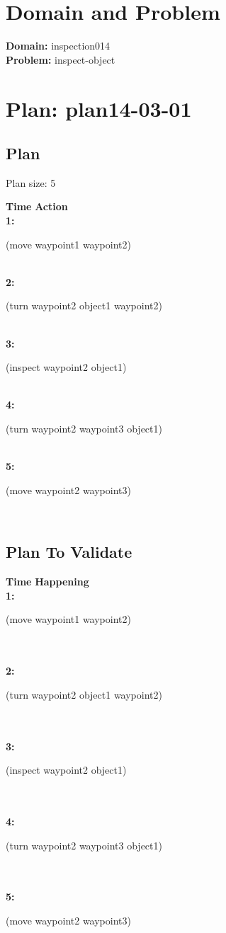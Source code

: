 \documentclass[a4paper,12pt]{article}
\author{\mbox{\sc {\sc Val}}}
\newcommand{\headingtimeaction}{{\bf Time} \qquad \= {\bf Action}\\[0.8ex]}
\newcommand{\headingtimehappening}{{\bf Time} \qquad \= {\bf Happening}\\[0.8ex]}
\newcommand{\atime}[1]{{\bf #1:}}
\newcommand{\action}[1]{{\sf #1}}
\newcommand{\listrow}[1]{\begin{minipage}[t]{11.5cm} #1 \end{minipage}}
\begin{document}
 \maketitle 
\section{Domain and Problem}
{\bf Domain:} inspection014\\
{\bf Problem:} inspect-object
\section{\sloppy Plan: plan14-03-01}
\subsection{Plan}
Plan size: 5
\begin{tabbing}
\headingtimeaction 
\atime{1} \> \listrow{\action{(move waypoint1 waypoint2)}}\\
\atime{2} \> \listrow{\action{(turn waypoint2 object1 waypoint2)}}\\
\atime{3} \> \listrow{\action{(inspect waypoint2 object1)}}\\
\atime{4} \> \listrow{\action{(turn waypoint2 waypoint3 object1)}}\\
\atime{5} \> \listrow{\action{(move waypoint2 waypoint3)}}\\
\end{tabbing}
\subsection{Plan To Validate}
\begin{tabbing}
\headingtimehappening 
\atime{1}  \> \listrow{\action{(move waypoint1 waypoint2)}}\\
\\\atime{2}  \> \listrow{\action{(turn waypoint2 object1 waypoint2)}}\\
\\\atime{3}  \> \listrow{\action{(inspect waypoint2 object1)}}\\
\\\atime{4}  \> \listrow{\action{(turn waypoint2 waypoint3 object1)}}\\
\\\atime{5}  \> \listrow{\action{(move waypoint2 waypoint3)}}\\
\end{tabbing}
\end{document}
